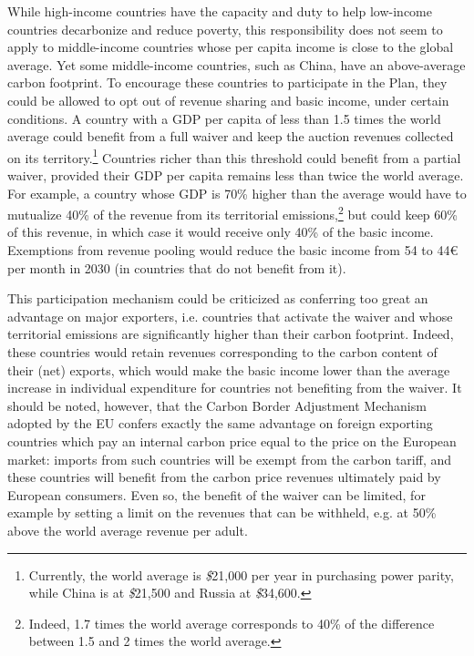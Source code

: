 \documentclass[a5paper,english,openany]{memoir}
\begin{document}
While high-income countries have the capacity and duty to help low-income countries decarbonize and reduce poverty, this responsibility does not seem to apply to middle-income countries whose per capita income is close to the global average. Yet some middle-income countries, such as China, have an above-average carbon footprint. To encourage these countries to participate in the Plan, they could be allowed to opt out of revenue sharing and basic income, under certain conditions. A country with a GDP per capita of less than 1.5 times the world average could benefit from a full waiver and keep the auction revenues collected on its territory.\footnote{Currently, the world average is \textit{\$}21,000 per year in purchasing power parity, while China is at \textit{\$}21,500 and Russia at \textit{\$}34,600.}  
Countries richer than this threshold could benefit from a partial waiver, provided their GDP per capita remains less than twice the world average. For example, a country whose GDP is 70\% higher than the average would have to mutualize 40\% of the revenue from its territorial emissions,\footnote{Indeed, 1.7 times the world average corresponds to 40\% of the difference between 1.5 and 2 times the world average.} but could keep 60\% of this revenue, in which case it would receive only 40\% of the basic income. Exemptions from revenue pooling would reduce the basic income from 54 to 44\euro{} per month in 2030 (in countries that do not benefit from it). 

This participation mechanism could be criticized %
as conferring too great an advantage on major exporters, i.e. countries that activate the waiver and whose territorial emissions are significantly higher than their carbon footprint. Indeed, these countries would retain revenues corresponding to the carbon content of their (net) exports, which would make the basic income lower than the average increase in individual expenditure for countries not benefiting %
from the waiver. It should be noted, however, that the Carbon Border Adjustment Mechanism adopted by the EU confers exactly the same advantage on foreign exporting countries which pay an internal carbon price equal to the price on the European market: imports from such countries will be exempt from the carbon tariff, %
and these countries will benefit from the carbon price revenues ultimately paid by European consumers. Even so, the benefit of the waiver can be limited, for example by setting a limit on the revenues that can be withheld, e.g. at 50\% above the world average revenue per adult. %
\end{document}
